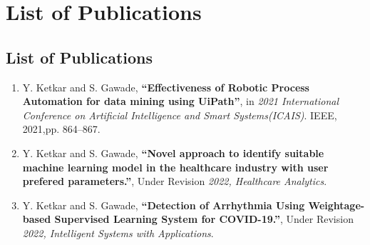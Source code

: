 \chapter*{List of Publications}
\thispagestyle{fancy}
\section*{\centering List of Publications}


\begin{enumerate}[label={}]
  \item Y. Ketkar and S. Gawade, \textbf{``Effectiveness of Robotic Process Automation for data mining using UiPath''}, in \emph{2021 International Conference on Artificial Intelligence and Smart Systems(ICAIS)}. IEEE, 2021,pp. 864--867.
  \item Y. Ketkar and S. Gawade, \textbf{``Novel approach to identify suitable machine learning model in the healthcare industry with user prefered parameters.''}, Under Revision \emph{2022, Healthcare Analytics}.
  \item Y. Ketkar and S. Gawade, \textbf{``Detection of Arrhythmia Using Weightage-based Supervised Learning System for COVID-19.''}, Under Revision \emph{2022, Intelligent Systems with Applications}.
\end{enumerate}